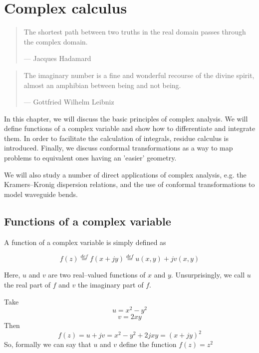 \chapter{Complex calculus}
\label{h:complex}


\begin{quote}
The shortest path between two truths in the real domain passes through the
complex domain.

--- Jacques Hadamard
\end{quote}

\begin{quote}
The imaginary number is a fine and wonderful recourse of the divine spirit,
almost an amphibian between being and not being.

--- Gottfried Wilhelm Leibniz
\end{quote}

\minitoc

In this chapter, we will discuss the basic principles of complex analysis. We
will define functions of a complex variable and show how to differentiate and
integrate them. In order to facilitate the calculation of integrals, residue
calculus is introduced. Finally, we discuss conformal transformations as a way
to map problems to equivalent ones having an 'easier' geometry. 

We will also study a number of direct applications of complex analysis, e.g. the 
Kramers--Kronig dispersion relations, and the use of conformal transformations 
to model waveguide bends.

\section{Functions of a complex variable}

A function of a complex variable is simply defined as

\begin{equation}
f(z) \stackrel{def}{=} f(x + j y) \stackrel{def}{=}  u(x,y) + j v(x,y)
\end{equation}

Here, $u$ and $v$ are two real--valued functions of $x$ and $y$. Unsurprisingly,
we call $u$ the real part of $f$ and $v$ the imaginary part of $f$.


\begin{sidebar}
\begin{exa}
Take
$$u = x^2 - y^2$$
$$v = 2 x y$$
Then
$$f(z) = u + j v = x^2 - y^2 +2j x y = (x + jy)^2$$
So, formally we can say that $u$ and $v$ define the function $f(z) = z^2$
\end{exa}
\end{sidebar}

